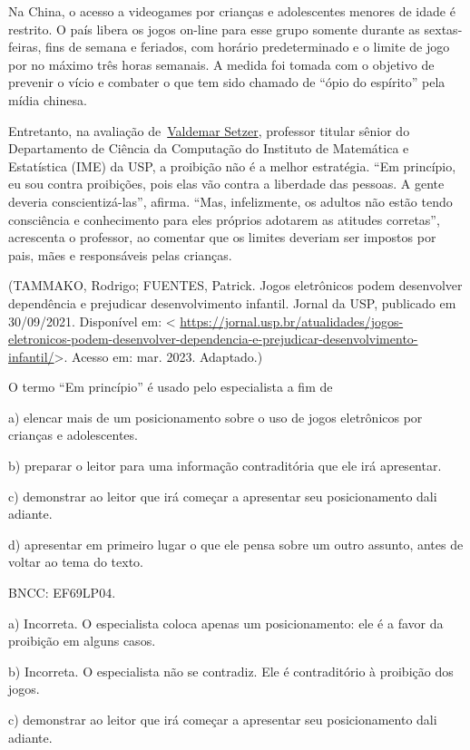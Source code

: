 {Na China, o acesso a videogames por crianças e adolescentes menores de
idade é restrito. O país libera os jogos on-line para esse grupo somente
durante as sextas-feiras, fins de semana e feriados, com horário
predeterminado e o limite de jogo por no máximo três horas semanais. A
medida foi tomada com o objetivo de prevenir o vício e combater o que
tem sido chamado de ``ópio do espírito'' pela mídia chinesa.

Entretanto, na avaliação
de~\href{https://www.ime.usp.br/~vwsetzer/}{Valdemar Setzer}, professor
titular sênior do Departamento de Ciência da Computação do Instituto de
Matemática e Estatística (IME) da USP, a proibição não é a melhor
estratégia. ``Em princípio, eu sou contra proibições, pois elas vão
contra a liberdade das pessoas. A gente deveria conscientizá-las'',
afirma. ``Mas, infelizmente, os adultos não estão tendo consciência e
conhecimento para eles próprios adotarem as atitudes corretas'',
acrescenta o professor, ao comentar que os limites deveriam ser impostos
por pais, mães e responsáveis pelas crianças.

(TAMMAKO, Rodrigo; FUENTES, Patrick. Jogos eletrônicos podem desenvolver
dependência e prejudicar desenvolvimento infantil. Jornal da USP,
publicado em 30/09/2021. Disponível em: \textless{}
\url{https://jornal.usp.br/atualidades/jogos-eletronicos-podem-desenvolver-dependencia-e-prejudicar-desenvolvimento-infantil/}\textgreater.
Acesso em: mar. 2023. Adaptado.)

O termo ``Em princípio'' é usado pelo especialista a fim de

a) elencar mais de um posicionamento sobre o uso de jogos eletrônicos
por crianças e adolescentes.

b) preparar o leitor para uma informação contraditória que ele irá
apresentar.

c) demonstrar ao leitor que irá começar a apresentar seu posicionamento
dali adiante.

d) apresentar em primeiro lugar o que ele pensa sobre um outro assunto,
antes de voltar ao tema do texto.

BNCC: EF69LP04.

a) Incorreta. O especialista coloca apenas um posicionamento: ele é a
favor da proibição em alguns casos.

b) Incorreta. O especialista não se contradiz. Ele é contraditório à
proibição dos jogos.

c) demonstrar ao leitor que irá começar a apresentar seu posicionamento
dali adiante.

}
